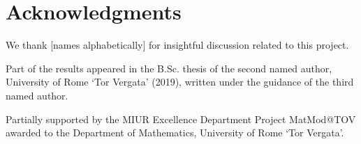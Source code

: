 
\section*{Acknowledgments}

We thank [names alphabetically] for insightful discussion related to this project.

Part of the results appeared in the B.Sc. thesis of the second named author, University of Rome `Tor Vergata' (2019), written under the guidance of the third named author.

Partially supported by  the MIUR Excellence Department Project
MatMod@TOV awarded to the Department of Mathematics, University of Rome
`Tor Vergata'.